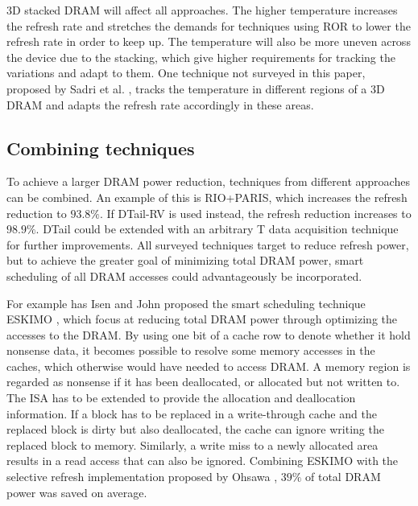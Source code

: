 3D stacked DRAM will affect all approaches. The higher temperature increases the refresh rate and stretches the demands for techniques using ROR to lower the refresh rate in order to keep up. The temperature will also be more uneven across the device due to the stacking, which give higher requirements for tracking the variations and adapt to them. One technique not surveyed in this paper, proposed by Sadri et al. \cite{tempaware}, tracks the temperature in different regions of a 3D DRAM and adapts the refresh rate accordingly in these areas.

\subsection{Combining techniques}

To achieve a larger DRAM power reduction, techniques from different approaches can be combined. An example of this is RIO+PARIS, which increases the refresh reduction to $93.8\%$. If DTail-RV is used instead, the refresh reduction increases to $98.9\%$. DTail could be extended with an arbitrary T data acquisition technique for further improvements. All surveyed techniques target to reduce refresh power, but to achieve the greater goal of minimizing total DRAM power, smart scheduling of all DRAM accesses could advantageously be incorporated. 

For example has Isen and John proposed the smart scheduling technique ESKIMO \cite{eskimo}, which focus at reducing total DRAM power through optimizing the accesses to the DRAM. By using one bit of a cache row to denote whether it hold nonsense data, it becomes possible to resolve some memory accesses in the caches, which otherwise would have needed to access DRAM. A memory region is regarded as nonsense if it has been deallocated, or allocated but not written to. The ISA has to be extended to provide the allocation and deallocation information. If a block has to be replaced in a write-through cache and the replaced block is dirty but also deallocated, the cache can ignore writing the replaced block to memory. Similarly, a write miss to a newly allocated area results in a read access that can also be ignored. Combining ESKIMO with the selective refresh implementation proposed by Ohsawa \cite{ohsawa}, $39\%$ of total DRAM power was saved on average.

